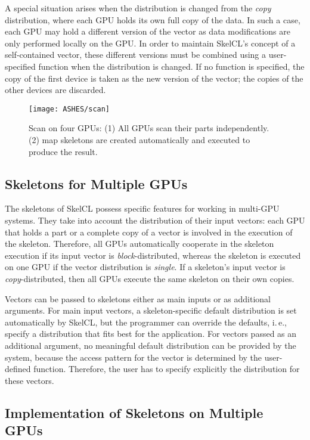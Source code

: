 A special situation arises when the distribution is changed from the \emph{copy} distribution, where each GPU holds its own full copy of the data.
In such a case, each GPU may hold a different version of the vector as data modifications are only performed locally on the GPU.
In order to maintain SkelCL's concept of a self-contained vector, these different versions must be combined using a user-specified function when the distribution is changed.
If no function is specified, the copy of the first device is taken as the new version of the vector; the copies of the other devices are discarded.

\begin{figure*}[tbp]
    \centering
    \texttt{[image: ASHES/scan]}
    \caption{Scan on four GPUs: (1) All GPUs scan their parts independently.
            (2) map skeletons are created automatically and
             executed to produce the result.}
    \label{fig:scan}
\end{figure*}

\subsection{Skeletons for Multiple GPUs}
\label{sec:multi-gpu_skeletons}

The skeletons of SkelCL possess specific features for working in multi-GPU systems.
They take into account the distribution of their input vectors: each GPU that holds a part or a complete copy of a vector is involved in the execution of the skeleton.
Therefore, all GPUs automatically cooperate in the skeleton execution if its input vector is \emph{block}-distributed, whereas the skeleton is executed on one GPU if the vector distribution is \emph{single}.
If a skeleton's input vector is \emph{copy}-distributed, then all GPUs execute the same skeleton on their own copies.

Vectors can be passed to skeletons either as main inputs or as additional arguments.
For main input vectors, a skeleton-specific default distribution is set automatically by SkelCL, but the programmer can override the defaults, i.\,e., specify a distribution that fits best for the application.
For vectors passed as an additional argument, no meaningful default distribution can be provided by the system, because the access pattern for the vector is determined by the user-defined function.
Therefore, the user has to specify explicitly the distribution for these vectors.

\subsection{Implementation of Skeletons on Multiple GPUs}

